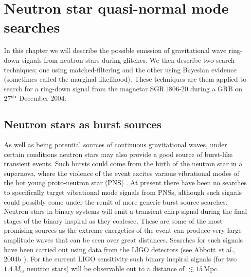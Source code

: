 \chapter{Neutron star quasi-normal mode searches}
In this chapter we will describe the possible emission of gravitational wave ring-down signals from
neutron stars during glitches. We then describe two search techniques; one using
matched-filtering and the other using Bayesian evidence (sometimes called the marginal likelihood).
These techniques are them applied to search for a ring-down signal from the magnetar SGR\,1806-20
during a GRB on $27^{\rm th}$ December
2004.

\section{Neutron stars as burst sources}
As well as being potential sources of continuous gravitational waves, under certain conditions
neutron stars may also provide a good source of burst-like transient events. Such bursts could come
from the birth of the neutron star in a supernova, where the violence of the event excites various
vibrational modes of the hot young proto-neutron star (PNS) \cite{AnderssonKokkotas:2005}. At
present there have been no searches to specifically target vibrational mode signals from PNSs,
although such signals could possibly come under the remit of more generic burst source searches.
Neutron stars in binary systems will emit a transient chirp signal during the final stages of the
binary inspiral as they coalesce. These are some of the most promising \gw sources as the extreme
energetics of the event can produce very large amplitude waves that can be seen over great
distances. Searches for such signals have been carried out using data from the LIGO detectors (see
Abbott {\it et al.}, 2004b \cite{Abbott2:2004}). For the current LIGO sensitivity such binary
inspiral signals (for two $1.4\,M_{\odot}$ neutron stars) will be observable out to a distance of
$\lesssim 15$\,Mpc.

